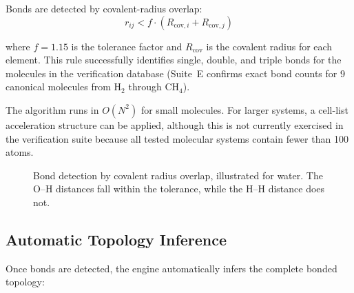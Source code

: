 \documentclass[11pt,twoside]{article}
\def\AA{Ang}%
\def\times{x}%
\begin{document}
Bonds are detected by covalent-radius overlap:
\begin{equation}
  r_{ij} < f \cdot (R_{\mathrm{cov},i} + R_{\mathrm{cov},j})
  \label{eq:bond-detect}
\end{equation}

where $f = 1.15$ is the tolerance factor and $R_{\mathrm{cov}}$ is the covalent radius for each element. This rule successfully identifies single, double, and triple bonds for the molecules in the verification database (Suite~E confirms exact bond counts for 9 canonical molecules from H$_2$ through CH$_4$).

The algorithm runs in $O(N^2)$ for small molecules. For larger systems, a cell-list acceleration structure can be applied, although this is not currently exercised in the verification suite because all tested molecular systems contain fewer than 100 atoms.

\begin{figure}[H]
\centering
{}
\caption{Bond detection by covalent radius overlap, illustrated for water. The O--H distances fall within the tolerance, while the H--H distance does not.}
\label{fig:bond-detect}
\end{figure}

\subsection{Automatic Topology Inference}

Once bonds are detected, the engine automatically infers the complete bonded topology:
\end{document}
